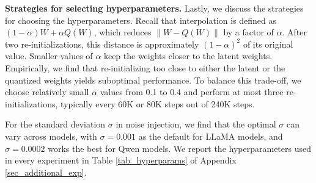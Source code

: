 \documentclass{article}
\theoremstyle{definition}
\newcommand{\norm}[1]{\|#1\|}
\begin{document}
\textbf{Strategies for selecting hyperparameters.} Lastly, we discuss the strategies for choosing the hyperparameters. Recall that interpolation is defined as $(1-\alpha)W + \alpha Q(W)$, which reduces $\norm{W - Q(W)}$ by a factor of $\alpha$. After two re-initializations, this distance is approximately $(1-\alpha)^2$ of its original value. Smaller values of $\alpha$ keep the weights closer to the latent weights. 
Empirically, we find that re-initializing too close to either the latent or the quantized weights yields suboptimal performance. To balance this trade-off, we choose relatively small $\alpha$ values from 0.1 to 0.4 and perform at most three re-initializations, typically every 60K or 80K steps out of 240K steps.

For the standard deviation $\sigma$ in noise injection, we find that the optimal $\sigma$ can vary across models, with $\sigma = 0.001$ as the default for LLaMA models, and $\sigma = 0.0002$ works the best for Qwen models. We report the hyperparameters used in every experiment in Table \ref{tab_hyperparams} of Appendix \ref{sec_additional_exp}.
\end{document}
